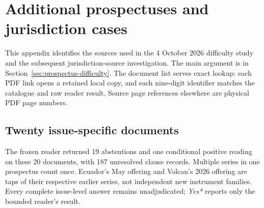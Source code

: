 \chapter{Additional prospectuses and jurisdiction cases}
\label{app:prospectus-difficulty}

This appendix identifies the sources used in the 4 October 2026 difficulty
study and the subsequent jurisdiction-source investigation. The main
argument is in Section~\ref{sec:prospectus-difficulty}. The document list
serves exact lookup: each PDF link opens a retained local copy, and each
nine-digit identifier matches the catalogue and raw reader result. Source
page references elsewhere are physical PDF page numbers.

\section{Twenty issue-specific documents}

The frozen reader returned 19 abstentions and one conditional positive
reading on these 20 documents, with 187 unresolved clause records. Multiple
series in one prospectus count once. Ecuador's May offering and Volcan's
2026 offering are taps of their respective earlier series, not independent
new instrument families. Every complete issue-level answer remains
unadjudicated; \emph{Yes*} reports only the bounded reader's result.

